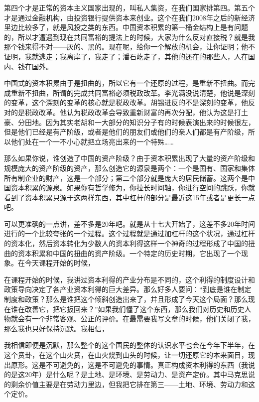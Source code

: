 \documentclass[UTF8, 12pt, a4paper]{ctexrep}
\begin{document}
第四个才是正常的资本主义国家出现的，叫私人集资，在我们国家排第四。第五个才是通过金融机构，由投资银行提供资本来创业。这个在我们2008年之后的新经济里边比较多了，就是风投之类的东西。中国资本积累的第一桶金结构上是有问题的，所以才遭遇到现在共同富裕的提法上的时候，大家为什么反对直接税？就是我那个钱来得不对——灰的、黑的。现在呢，给你一个解放的机会，让你证明；他不证明，我就逃走；我离岸了，我走了；潘石屹走了，其他的还在的那些人，人在国内、钱在国外。

中国式的资本积累由于是扭曲的，所以它有一个还原的过程，是重新不扭曲。而完成重新不扭曲，所谓的完成共同富裕必须税政改革。李光满没说清楚，他说是深刻的变革，这个深刻的变革的核心就是税政改革。胡锡进反的不是深刻的变革，他反对的是税政改革。他认为税政改革会导致重新财富的再次分配，他认为这是打土豪、分田地。因为其实老胡和一大部分的知识分子有的时候表演出来的时候很左，但是他们已经是有产阶级，或者是他们的朋友们或他们的亲人们都是有产阶级，所以他们处在一个一不小心就把立场亮出来的一个特殊……

那么如果你说，谁创造了中国的资产阶级？由于资本积累出现了大量的资产阶级和规模庞大的资产阶级的资产，那么创造它的源泉是两个：一个是国有、国家和集体所有制企业的财产，这是一个部分；第二个部分就是庞大的居民储蓄。这两个是中国资本积累的源泉。如果你有哲学修为，你拉长时间轴，你进行空间的跳跃，你就看到了资本积累只源于这两样东西，其中杠杆的部分是最近这15年或者是更长一点吧。

可以更准确的一点讲，差不多是20年吧。就是从十七大开始了，这差不多20年时间进行的一个比较夸张的一个过程。这个过程就是通过加杠杆的这个状况，通过杠杆的资本化，然后资本转化为少数人的资本利得这样一个神奇的过程形成了中国的扭曲的资本积累和中国的扭曲的资产阶级。一个特定的历史时期，它出现了一个现象。在今天课程开始的时候，

在课程开始的时候，我讲过资本利得的产业分布是不同的，这个利得的制度设计和政策导向决定了各产业资本利得的巨大差异。那么好多人要问：“到底是谁在制定制度和政策？那么是谁把这个倾斜创造出来了，并且形成了今天这个局面？那么现在谁在改善它，把它扳回来？”如果我们懂了这个东西，那么我们对历史和历史人物就会有一个非常客观、公正的评价。在最需要我写文章的时候，他们关闭了我，那么我也只好保持沉默。我相信，

我相信即便是沉默，那么整个的这个国民的整体的认识水平也会在今年下半年，在这个贲卦，在这个山火贲，在山火烧到山头的时候，让一切还原它的本来面目，现出原形。这是不可避免的，这是不可避免的事情。真正构成资本利得的东西（我说的是这20年）是什么呢？是土地、是环境、是劳动力、是资产定价。其中马克思说的剩余价值主要是在劳动力里边，但我把它排在第三——土地、环境、劳动力和这个定价。
\end{document}
